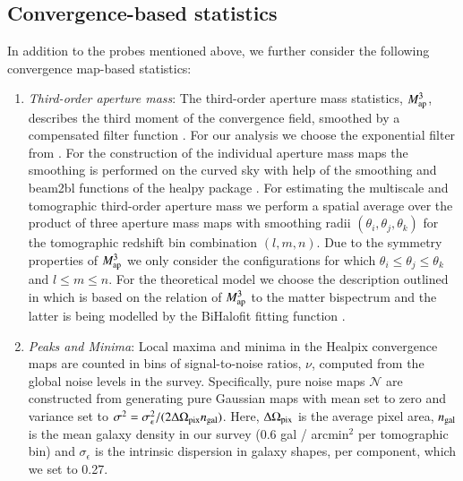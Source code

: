 \subsection{Convergence-based statistics}

In addition to the probes mentioned above, we further consider the following convergence map-based statistics:
\begin{enumerate}
    \item {\it Third-order aperture mass}:  
    The third-order aperture mass statistics, $M_{\rm ap}^3$, describes the third moment of the convergence field, smoothed by a compensated filter function \citep{Schneider1998}. For our analysis we choose the exponential filter from \citep{Crittenden2002}. For the construction of the individual aperture mass maps the smoothing is performed on the curved sky with help of the {\sc smoothing} and {\sc beam2bl} functions of the {\sc healpy} package \citep{Zonca2019}. For estimating the multiscale and tomographic third-order aperture mass we perform a spatial average over the product of three aperture mass maps with smoothing radii $(\theta_i,\theta_j,\theta_k)$ for the tomographic redshift bin combination $(l,m,n)$. Due to the symmetry properties of $M_{\rm ap}^3$ we only consider the configurations for which $\theta_i \leq \theta_j \leq \theta_k$ and $l\leq m\leq n$. For the theoretical model we choose the description outlined in \citep{Heydenreichetal2023} which is based on the relation of $M_{\rm ap}^3$ to the matter bispectrum and the latter is being modelled by the {\sc BiHalofit} fitting function \citep{Takahashietal2020}.
    \item \textit{Peaks and Minima}: Local maxima and minima in the {\sc Healpix} convergence maps are counted in bins of signal-to-noise ratios, $\nu$, computed from the global  noise levels in the survey. Specifically, pure noise maps $\mathcal{N}$ are constructed from generating pure Gaussian maps with mean set to zero and variance set to $\sigma^2 =  \sigma_\epsilon^2 / (2 \Delta \Omega_{\rm pix} n_{\rm gal})$. Here, $\Delta \Omega_{\rm pix}$ is the average pixel area, $n_{\rm gal}$ is the mean galaxy density in our survey (0.6 gal / arcmin$^2$ per tomographic bin)  and $\sigma_\epsilon$ is the intrinsic dispersion in galaxy shapes, per component, which we set to 0.27.

\end{enumerate}

